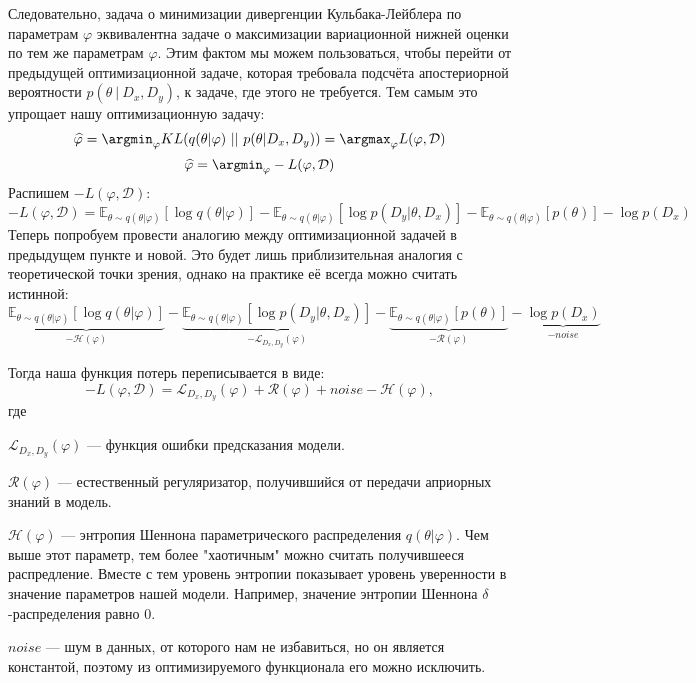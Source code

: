 Следовательно, задача о минимизации дивергенции Кульбака-Лейблера по параметрам $\varphi$ эквивалентна задаче о максимизации вариационной нижней оценки по тем же параметрам $\varphi$. Этим
 фактом мы можем пользоваться, чтобы перейти от предыдущей оптимизационной задаче, которая требовала подсчёта апостериорной вероятности $p(\theta\ |\ D_x, D_y)$, к
 задаче, где этого не требуется. Тем самым это упрощает нашу оптимизационную задачу:
$$\widehat{\varphi} = \argmin_{\varphi} KL(q(\theta | \varphi)\ ||\ p(\theta | D_x, D_y)) = \argmax_{\varphi} L(\varphi, \mathcal{D})$$
$$\widehat{\varphi} = \argmin_{\varphi} -L(\varphi, \mathcal{D})$$
Распишем $-L(\varphi, \mathcal{D})$:
$$-L(\varphi, \mathcal{D}) =  \mathbb{E}_{\theta \sim q(\theta | \varphi)} [\log q(\theta | \varphi)] -
\mathbb{E}_{\theta \sim q(\theta | \varphi)} [\log p(D_y | \theta, D_x)] - \mathbb{E}_{\theta \sim q(\theta | \varphi)} [p(\theta)] - \log p(D_x)$$
Теперь попробуем провести аналогию между оптимизационной задачей в предыдущем пункте и новой. Это будет лишь приблизительная аналогия с теоретической точки зрения,
 однако на практике её всегда можно считать истинной:
$$\underbrace{\mathbb{E}_{\theta \sim q(\theta | \varphi)} [\log q(\theta | \varphi)]}_{-\mathcal{H}(\varphi)} -
\underbrace{\mathbb{E}_{\theta \sim q(\theta | \varphi)} [\log p(D_y | \theta, D_x)]}_{-\mathcal{L}_{D_x,D_y}(\varphi)} -
\underbrace{\mathbb{E}_{\theta \sim q(\theta | \varphi)} [p(\theta)]}_{-\mathcal{R}(\varphi)} - \underbrace{\log p(D_x)}_{-noise}$$

Тогда наша функция потерь переписывается в виде:
$$-L(\varphi, \mathcal{D}) = \mathcal{L}_{D_x,D_y}(\varphi) + \mathcal{R}(\varphi) + noise - \mathcal{H}(\varphi),$$
где

$\mathcal{L}_{D_x,D_y}(\varphi)$ --- функция ошибки предсказания модели.

$\mathcal{R}(\varphi)$ --- естественный регуляризатор, получившийся от передачи априорных знаний в модель.

$\mathcal{H}(\varphi)$ --- энтропия Шеннона параметрического распределения $q(\theta | \varphi)$. Чем выше этот параметр, тем более "хаотичным" можно считать
 получившееся распредление. Вместе с тем уровень энтропии показывает уровень уверенности в значение параметров нашей модели. Например, значение энтропии Шеннона
 $\delta$-распределения равно 0.

$noise$ --- шум в данных, от которого нам не избавиться, но он является константой, поэтому из оптимизируемого функционала его можно исключить.

